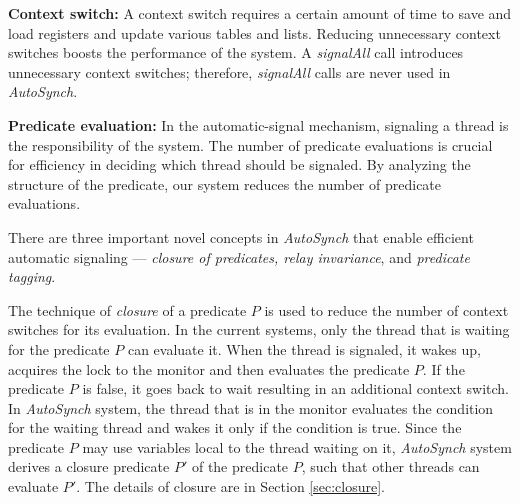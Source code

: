 \documentclass{sigplanconf}
\begin{document}
\begin{description}
    \item{\bf Context switch:} A context switch requires a certain 
        amount of time to save and load registers and update various tables and
        lists. Reducing unnecessary context switches boosts the performance of the system.
        A {\em signalAll} call introduces unnecessary context switches; therefore,
        {\em signalAll} calls are never used in {\em AutoSynch}. 
    \item {\bf Predicate evaluation:} In the 
        automatic-signal mechanism, signaling a thread is the 
        responsibility of the system. The number of predicate evaluations is 
        crucial for efficiency in deciding which thread should be signaled. 
        By analyzing the structure of the predicate, our system reduces the number of predicate evaluations.
\end{description}


There are three important novel concepts in {\em AutoSynch} that enable efficient automatic
signaling --- {\em closure of predicates, relay invariance}, and {\em predicate
tagging}.

The technique of {\em closure} of a predicate $P$ is used to reduce the number of 
context switches for its evaluation. In the current systems, only the thread that is waiting
for the predicate $P$ can evaluate it. When the thread is signaled, it wakes up, acquires the
lock to the monitor and then evaluates the predicate $P$. If the predicate $P$ is false, it
goes back to wait resulting in an additional context switch. In {\em AutoSynch} system, the thread
that is in the monitor evaluates the condition for the waiting thread and wakes it only
if the condition is true. Since the predicate $P$ may use variables local to the thread
waiting on it, {\em AutoSynch} system derives a closure predicate $P'$ of
the predicate $P$, such that other threads can evaluate $P'$. 
The details of closure are in Section \ref{sec:closure}.

\end{document}
